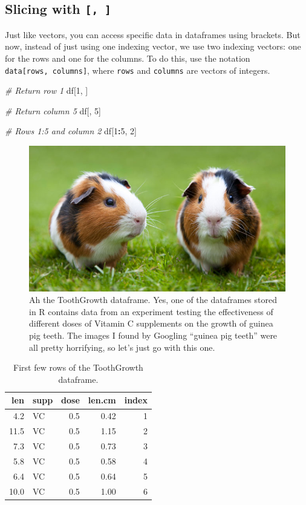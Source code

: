 \documentclass[]{book}
\newenvironment{Shaded}{\begin{snugshade}}{\end{snugshade}}
\newcommand{\DecValTok}[1]{\textcolor[rgb]{0.00,0.00,0.81}{#1}}
\newcommand{\CommentTok}[1]{\textcolor[rgb]{0.56,0.35,0.01}{\textit{#1}}}
\newcommand{\OperatorTok}[1]{\textcolor[rgb]{0.81,0.36,0.00}{\textbf{#1}}}
\newcommand{\NormalTok}[1]{#1}
\theoremstyle{definition}
\theoremstyle{definition}
\theoremstyle{remark}
\begin{document}
\subsection{\texorpdfstring{Slicing with
\texttt{{[},\ {]}}}{Slicing with {[}, {]}}}\label{slicing-with}

Just like vectors, you can access specific data in dataframes using
brackets. But now, instead of just using one indexing vector, we use two
indexing vectors: one for the rows and one for the columns. To do this,
use the notation \texttt{data{[}rows,\ columns{]}}, where \texttt{rows}
and \texttt{columns} are vectors of integers.

\begin{Shaded}
\begin{Highlighting}[]
\CommentTok{# Return row 1}
\NormalTok{df[}\DecValTok{1}\NormalTok{, ]}

\CommentTok{# Return column 5}
\NormalTok{df[, }\DecValTok{5}\NormalTok{]}

\CommentTok{# Rows 1:5 and column 2}
\NormalTok{df[}\DecValTok{1}\OperatorTok{:}\DecValTok{5}\NormalTok{, }\DecValTok{2}\NormalTok{]}
\end{Highlighting}
\end{Shaded}

\begin{figure}

{\centering \includegraphics[width=0.3\linewidth]{images/guineapig} 

}

\caption{Ah the ToothGrowth dataframe. Yes, one of the dataframes stored in R contains data from an experiment testing the effectiveness of different doses of Vitamin C supplements on the growth of guinea pig teeth. The images I found by Googling ``guinea pig teeth'' were all pretty horrifying, so let's just go with this one.}\label{fig:unnamed-chunk-209}
\end{figure}

\begin{table}

\caption{\label{tab:unnamed-chunk-210}First few rows of the ToothGrowth dataframe.}
\centering
\begin{tabular}[t]{r|l|r|r|r}
\hline
len & supp & dose & len.cm & index\\
\hline
4.2 & VC & 0.5 & 0.42 & 1\\
\hline
11.5 & VC & 0.5 & 1.15 & 2\\
\hline
7.3 & VC & 0.5 & 0.73 & 3\\
\hline
5.8 & VC & 0.5 & 0.58 & 4\\
\hline
6.4 & VC & 0.5 & 0.64 & 5\\
\hline
10.0 & VC & 0.5 & 1.00 & 6\\
\hline
\end{tabular}
\end{table}
\end{document}
